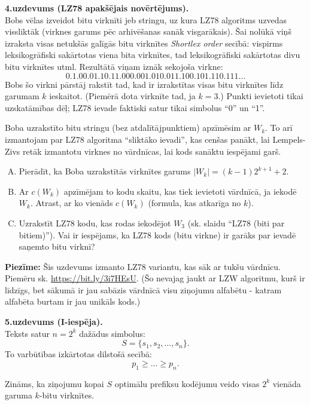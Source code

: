 \documentclass[a4paper]{article}
\begin{document}
\vspace{10pt}
{\bf 4.uzdevums (LZ78 apakšējais novērtējums).}\\
Bobs vēlas izveidot bitu virknīti jeb stringu, uz kura 
LZ78 algoritms uzvedas vissliktāk (virknes garums pēc arhivēšanas sanāk visgarākais).
Šai nolūkā viņš izraksta visas netukšās galīgās bitu virknītes {\em Shortlex order} secībā:
vispirms leksikogrāfiski sakārtotas viena bita virknītes, tad leksikogrāfiski sakārtotas
divu bitu virknītes utml. Rezultātā viņam iznāk sekojoša virkne:
$$\mathtt{0.1.00.01.10.11.000.001.010.011.100.101.110.111}\ldots$$
Bobs šo virkni pārstāj rakstīt tad, kad ir izrakstītas visas bitu virknītes līdz garumam $k$ ieskaitot. 
(Piemērā dota virknīte tad, ja $k=3$.) Punkti ievietoti tikai uzskatāmības dēļ; LZ78 
ievade faktiski satur tikai simbolus ``0'' un ``1''.

Boba uzrakstīto bitu stringu (bez atdalītājpunktiem) apzīmēsim ar $W_k$. 
To arī izmantojam par LZ78 algoritma ``sliktāko ievadi'', 
kas cenšas panākt, lai Lempels-Zivs retāk
izmantotu virknes no vārdnīcas, lai kods sanāktu iespējami garš.

\begin{enumerate}[(A)]
\item Pierādīt, ka Boba uzrakstītās virknītes garums $|W_k| = (k-1)2^{k+1} + 2$.
\item Ar $c(W_k)$ apzīmējam to kodu skaitu, kas tiek ievietoti vārdnīcā, ja iekodē $W_k$. 
Atrast, ar ko vienāds $c(W_k)$ (formula, kas atkarīga no $k$).
\item Uzrakstīt LZ78 kodu, kas rodas iekodējot $W_3$ (sk. slaidu ``LZ78 (biti par bitiem)''). 
Vai ir iespējams, ka LZ78 kods (bitu virkne) ir garāks par ievadē saņemto bitu virkni?
\end{enumerate}

{\bf Piezīme:} Šis uzdevums izmanto LZ78 variantu, kas sāk ar tukšu vārdnīcu. 
Piemēru sk. \url{https://bit.ly/3i7HEsU}. 
(Šo nevajag jaukt ar LZW algoritmu, kurš ir līdzīgs, bet sākumā ir jau sabāzis vārdnīcā 
visu ziņojumu alfabētu - katram alfabēta burtam ir jau unikāls kods.)




\vspace{10pt}
{\bf 5.uzdevums (I-iespēja).}\\
Teksts satur $n = 2^k$ dažādus simbolus:
$$S = \{ s_1,s_2,\ldots,s_n \}.$$
To
varbūtības izkārtotas dilstošā secībā:
$$p_1 \geq \ldots \geq p_n.$$

Zināms, ka ziņojumu kopai $S$
optimālu prefiksu ko\-dē\-ju\-mu veido visas
$2^k$ vienāda garuma $k$-bitu virk\-nī\-tes.
\end{document}
